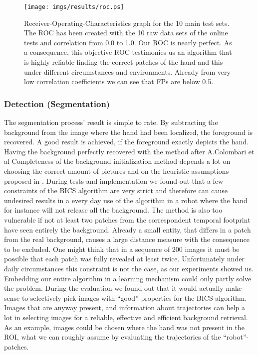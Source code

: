 \documentclass[conference]{IEEEtran}
\begin{document}
%
\begin{figure}
	\begin{center}
		\texttt{[image: imgs/results/roc.ps]}
			\caption[Receiver-Operating-Characteristics graph for the 10 main test sets. ]{Receiver-Operating-Characteristics graph for the 10 main test sets. The ROC has been created with the 10 raw data sets of the online tests and correlation from 0.0 to 1.0. Our ROC is nearly perfect. As a consequence, this objective ROC testimonies us an algorithm that is highly reliable finding the correct patches of the hand and this under different circumstances and environments. Already from very low correlation coefficients we can see that FPs are below 0.5. }
			\label{fig:result:roc}
	\end{center}
\end{figure}
%
%
\subsubsection{Detection (Segmentation)}
\label{results:evaluation:segmentation}
%
The segmentation process' result is simple to rate. By subtracting the background from the image where the hand had been localized, the foreground is recovered. A good result is achieved, if the foreground exactly depicts the hand. Having the background perfectly recovered with the method after A.Colombari et al \cite{} Completeness of the background initialization method depends a lot on choosing the correct amount of pictures and on the heuristic assumptions proposed in \cite{BICS06}. During tests and implementation we found out that a few constraints of the BICS algorithm are very strict and therefore can cause undesired results in a every day use of the algorithm in a robot where the hand for instance will not release all the background. The method is also too vulnerable if not at least two patches from the correspondent temporal footprint have seen entirely the background. Already a small entity, that differs in a patch from the real background, causes a large distance measure with the consequence to be excluded. One might think that in a sequence of 200 images it must be possible that each patch was fully revealed at least twice. Unfortunately under daily circumstances this constraint is not the case, as our experiments showed us. Embedding our entire algorithm in a learning mechanism could only partly solve the problem. During the evaluation we found out that it would actually make sense to selectively pick images with ``good'' properties for the BICS-algorithm. Images that are anyway present, and information about trajectories can help a lot in selecting images for a reliable, effective and efficient background retrieval. As an example, images could be chosen where the hand was not present in the ROI, what we can roughly assume by evaluating the trajectories of the ``robot''-patches. 
\end{document}
